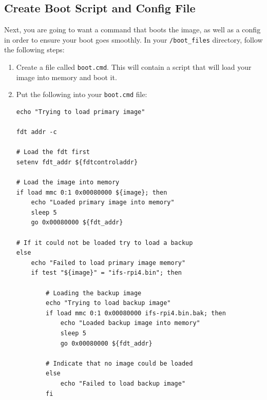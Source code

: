 \documentclass[12pt]{article}
\begin{document}
\subsection{Create Boot Script and Config File}
Next, you are going to want a command that boots the image, as well as a config in order to ensure your boot goes smoothly. In your \texttt{/boot\_files} directory, follow the following steps:
\begin{enumerate}
    \item Create a file called \texttt{boot.cmd}. This will contain a script that will load your image into memory and boot it.
    \item Put the following into your \texttt{boot.cmd} file:
    \begin{verbatim}
echo "Trying to load primary image"

fdt addr -c

# Load the fdt first
setenv fdt_addr ${fdtcontroladdr}

# Load the image into memory
if load mmc 0:1 0x00080000 ${image}; then
    echo "Loaded primary image into memory"
    sleep 5
    go 0x00080000 ${fdt_addr}

# If it could not be loaded try to load a backup
else
    echo "Failed to load primary image memory"
    if test "${image}" = "ifs-rpi4.bin"; then

        # Loading the backup image
        echo "Trying to load backup image"
        if load mmc 0:1 0x00080000 ifs-rpi4.bin.bak; then
            echo "Loaded backup image into memory"
            sleep 5
            go 0x00080000 ${fdt_addr}

        # Indicate that no image could be loaded
        else
            echo "Failed to load backup image"
        fi


\end{verbatim}
\end{enumerate}
\end{document}
